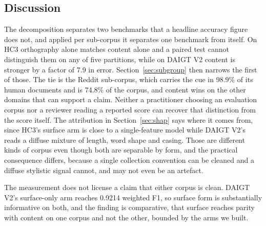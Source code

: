 \subsection{Discussion}
\label{sec:discussion}

The decomposition separates two benchmarks that a headline accuracy figure does not, and applied per sub-corpus it separates one benchmark from itself. On HC3 orthography alone matches content alone and a paired test cannot distinguish them on any of five partitions, while on DAIGT V2 content is stronger by a factor of 7.9 in error. Section~\ref{sec:subgroup} then narrows the first of those. The tie is the Reddit sub-corpus, which carries the cue in 98.9\% of its human documents and is 74.8\% of the corpus, and content wins on the other domains that can support a claim. Neither a practitioner choosing an evaluation corpus nor a reviewer reading a reported score can recover that distinction from the score itself. The attribution in Section~\ref{sec:shap} says where it comes from, since HC3's surface arm is close to a single-feature model while DAIGT V2's reads a diffuse mixture of length, word shape and casing. Those are different kinds of corpus even though both are separable by form, and the practical consequence differs, because a single collection convention can be cleaned and a diffuse stylistic signal cannot, and may not even be an artefact.

The measurement does not license a claim that either corpus is clean. DAIGT V2's surface-only arm reaches 0.9214 weighted F1, so surface form is substantially informative on both, and the finding is comparative, that surface reaches parity with content on one corpus and not the other, bounded by the arms we built.

